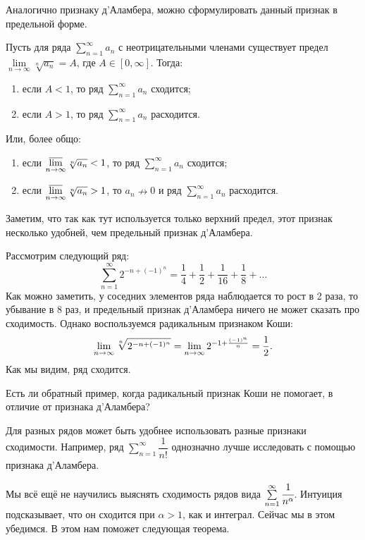 Аналогично признаку д'Аламбера, можно сформулировать данный признак в предельной форме.
\begin{Consequence}
	Пусть для ряда	 $\sum\limits_{n=1}^{\infty} a_n$ с неотрицательными членами существует предел $\lim\limits_{n\rightarrow\infty} \sqrt[n]{a_n} = A$, где $A \in [0, \infty]$. Тогда:
	\begin{enumerate}
		\item если $A < 1$, то ряд $\sum\limits_{n=1}^{\infty} a_n$ сходится;
		\item если $A > 1$, то ряд $\sum\limits_{n=1}^{\infty} a_n$ расходится.
	\end{enumerate}
	Или, более общо:
	\begin{enumerate}
	\item если $\varlimsup\limits_{n\rightarrow \infty} \sqrt[n]{a_n} < 1$, то ряд $\sum\limits_{n=1}^{\infty} a_n$ сходится;
	\item если $\varlimsup\limits_{n\rightarrow \infty} \sqrt[n]{a_n} > 1$, то $a_n \nrightarrow 0$ и ряд $\sum\limits_{n=1}^{\infty} a_n$ расходится.
	\end{enumerate}
\end{Consequence}
Заметим, что так как тут используется только верхний предел, этот признак несколько удобней, чем предельный признак д'Аламбера.

\begin{Examples}
Рассмотрим следующий ряд:
$$
\sum\limits_{n=1}^{\infty} 2^{-n+(-1)^n} = \frac{1}{4} + \frac{1}{2} + \frac{1}{16} + \frac{1}{8} + \ldots 
$$
Как можно заметить, у соседних элементов ряда наблюдается то рост в 2 раза, то убывание в 8 раз, и предельный признак д'Аламбера ничего не может сказать про сходимость. Однако воспользуемся радикальным признаком Коши:
$$
\lim_{n\rightarrow \infty} \sqrt[n]{2^{-n + (-1)^n}} = \lim_{n\rightarrow \infty} 2^{-1 + \frac{(-1)^n}{n}} = \frac{1}{2}.
$$
Как мы видим, ряд сходится.
\end{Examples}

\begin{Task}
Есть ли обратный пример, когда радикальный признак Коши не помогает, в отличие от признака д'Аламбера?
\end{Task}

Для разных рядов может быть удобнее использовать разные признаки сходимости. Например, ряд $\sum\limits_{n=1}^{\infty} \dfrac{1}{n!}$ однозначно лучше исследовать с помощью признака д'Аламбера.

Мы всё ещё не научились выяснять сходимость рядов вида $\sum\limits_{n = 1}^{\infty}\cfrac{1}{n^\alpha}$. Интуиция подсказывает, что он сходится при $\alpha > 1$, как и интеграл. Сейчас мы в этом убедимся. В этом нам поможет следующая теорема.

